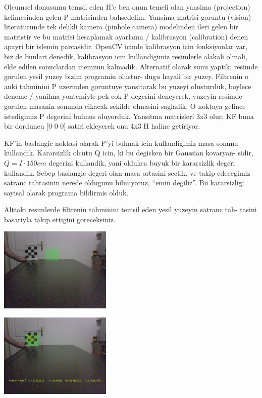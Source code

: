 \documentclass[12pt,fleqn]{article}
\begin{document}
Olcumsel donusumu temsil eden H'e ben onun temeli olan yansima (projection)
kelimesinden gelen P matrisinden bahsedelim. Yansima matrisi goruntu
(vision) literaturunde tek delikli kamera (pinhole camera) modelinden ileri
gelen bir matristir ve bu matrisi hesaplamak ayarlama / kalibrasyon
(calibration) denen apayri bir islemin parcasidir. OpenCV icinde
kalibrasyon icin fonksiyonlar var, biz de bunlari denedik, kalibrasyon icin
kullandigimiz resimlerle alakali olmali, elde edilen sonuclardan memnun
kalmadik. Alternatif olarak sunu yaptik; resimde gorulen yesil yuzey bizim
programin olustur- dugu hayali bir yuzey. Filtrenin o anki tahminini P
uzerinden goruntuye yansitarak bu yuzeyi olusturduk, boylece deneme /
yanilma yontemiyle pek cok P degerini deneyerek, yuzeyin resimde gorulen
masanin sonunda cikacak sekilde olmasini sagladik. O noktaya gelince
istedigimiz P degerini bulmus oluyorduk. Yansitma matrisleri 3x3 olur, KF
buna bir dorduncu [0 0 0] satiri ekleyerek onu 4x3 H haline getiriyor.

KF'in baslangic noktasi olarak P'yi bulmak icin kullandigimiz masa sonunu
kullandik. Kararsizlik olcutu Q icin, ki bu degisken bir Gaussian kovaryan-
sidir, $Q = I \cdot 150 cm$ degerini kullandik, yani oldukca buyuk bir
kararsizlik degeri kullandik. Sebep baslangic degeri olan masa ortasini
sectik, ve takip edecegimiz satranc tahtasinin nerede oldugunu bilmiyoruz,
``emin degiliz''.  Bu kararsizligi sayisal olarak programa bildirmis olduk.

Alttaki resimlerde filtrenin tahminini temsil eden yesil yuzeyin satranc tah-
tasini basariyla takip ettigini goreceksiniz.





\includegraphics[height=4cm]{cb-kf-00.jpg}

\includegraphics[height=4cm]{cb-kf-1.jpg}
\end{document}
